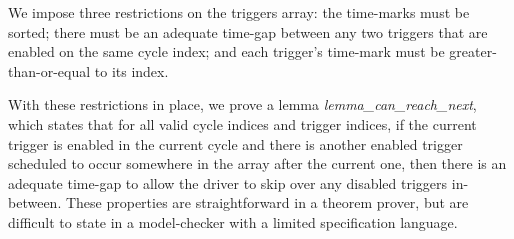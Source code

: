 
We impose three restrictions on the triggers array: the time-marks must be sorted; there must be an adequate time-gap between any two triggers that are enabled on the same cycle index; and each trigger's time-mark must be greater-than-or-equal to its index.

With these restrictions in place, we prove a lemma \emph{lemma_can_reach_next}, which states that for all valid cycle indices and trigger indices, if the current trigger is enabled in the current cycle and there is another enabled trigger scheduled to occur somewhere in the array after the current one, then there is an adequate time-gap to allow the driver to skip over any disabled triggers in-between.
These properties are straightforward in a theorem prover, but are difficult to state in a model-checker with a limited specification language.

  
